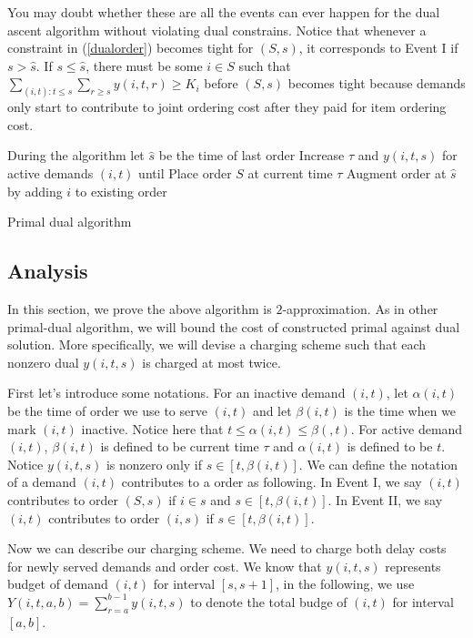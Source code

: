 You may doubt whether these are all the events can ever happen for the dual ascent algorithm without violating dual constrains. Notice that whenever a constraint in (\ref{dualorder}) becomes tight for $(S,s)$, it corresponds to Event I if $s > \hat s$. If $s \le \hat s$, there must be some $i \in S$ such that $\sum_{(i,t): t\le s} \sum_{r\ge s} y(i,t,r) \ge K_i$ before $(S,s)$ becomes tight because demands only start to contribute to joint ordering cost after they paid for item ordering cost.

\begin{algorithm}
\begin{algorithmic}
\State During the algorithm let $\hat s$ be the time of last order
\State Increase $\tau$ and $y(i,t,s)$ for active demands $(i,t)$ until
\State Place order $S$ at current time $\tau$
\State Augment order at $\hat s$ by adding $i$ to existing order
\EndIf
\EndWhile
\end{algorithmic}
\caption{Primal dual algorithm}
\end{algorithm}

\subsection{Analysis}
In this section, we prove the above algorithm is $2$-approximation. As in other primal-dual algorithm, we will bound the cost of constructed primal against dual solution. More specifically, we will devise a charging scheme such that each nonzero dual $y(i,t,s)$ is charged at most twice.

First let's introduce some notations. For an inactive demand $(i,t)$, let $\alpha(i,t)$ be the time of order we use to serve $(i,t)$ and let $\beta(i,t)$ is the time when we mark $(i,t)$ inactive. Notice here that $t \le \alpha(i,t) \le \beta(,t)$. For active demand $(i,t)$, $\beta(i,t)$ is defined to be current time $\tau$ and $\alpha(i,t)$ is defined to be $t$. Notice $y(i,t,s)$ is nonzero only if $s \in [t, \beta(i,t)]$. We can define the notation of a demand $(i,t)$ contributes to a order as following. In Event I, we say $(i,t)$ contributes to order $(S,s)$ if $i \in s$ and $s \in [t, \beta(i,t)]$. In Event II, we say $(i,t)$ contributes to order $(i,s)$ if $s \in [t, \beta(i,t)]$.

Now we can describe our charging scheme. We need to charge both delay costs for newly served demands and order cost. We know that $y(i,t,s)$ represents budget of demand $(i,t)$ for interval $[s,s+1]$, in the following, we use $Y(i,t,a,b) = \sum_{r = a}^{b-1} y(i,t,s)$ to denote the total budge of $(i,t)$ for interval $[a,b]$.

